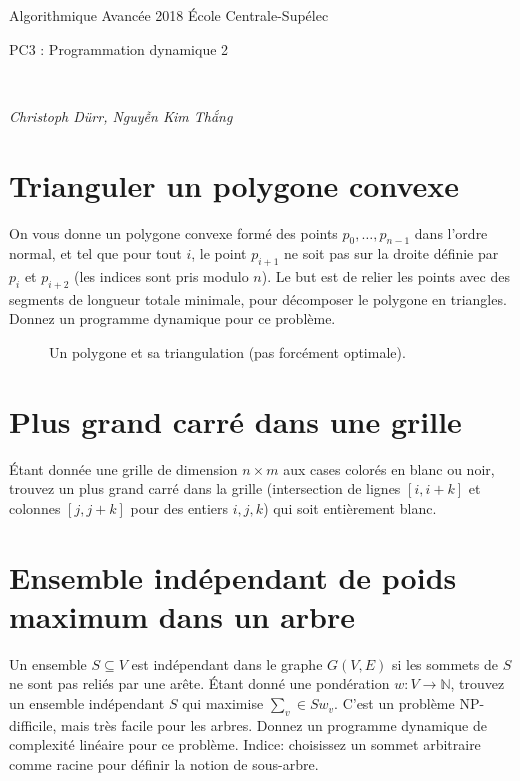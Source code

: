 \documentclass[12pt]{article}
\newcommand{\MakeScribeTop}[1]{
\noindent
\begin{framed}
\noindent
 Algorithmique Avancée 2018
 \hfill
 École Centrale-Supélec
 \\[1em]
 \centerline{ \Large
#1
 }
 \\[1em]
\centerline{  \it Christoph Dürr, Nguyễn Kim Thắng}
\end{framed}
}
\begin{document}
    \MakeScribeTop{PC3 : Programmation dynamique 2}

    \section{Trianguler un polygone convexe}

    On vous donne un polygone convexe formé des points $p_0,\ldots,p_{n-1}$ dans l'ordre normal, et tel que pour tout $i$, le point $p_{i+1}$ ne soit pas sur la droite définie par $p_i$ et $p_{i+2}$ (les indices sont pris modulo $n$).
    Le but est de relier les points avec des segments de longueur totale minimale, pour décomposer le polygone en triangles.
    Donnez un programme dynamique pour ce problème.

\begin{figure}[ht]
\begin{center}
\end{center}
\caption{Un polygone et sa triangulation (pas forcément optimale).}
\end{figure}

\section{Plus grand carré dans une grille}

Étant donnée une grille de dimension $n\times m$ aux cases colorés en blanc ou noir, trouvez un plus grand carré dans la grille (intersection de lignes $[i,i+k]$ et colonnes $[j,j+k]$ pour des entiers $i,j,k$) qui soit entièrement blanc.


\section{Ensemble indépendant de poids maximum dans un arbre}

Un ensemble $S\subseteq V$ est indépendant dans le graphe $G(V,E)$ si les sommets de $S$ ne sont pas reliés par une arête.
Étant donné une pondération $w:V\rightarrow \mathbb N$, trouvez un ensemble indépendant $S$ qui maximise $\sum_v\in S w_v$.  C'est un problème NP-difficile, mais très facile pour les arbres.  Donnez un programme dynamique de complexité linéaire pour ce problème.  Indice: choisissez un sommet arbitraire comme racine pour définir la notion de sous-arbre.
\end{document}
